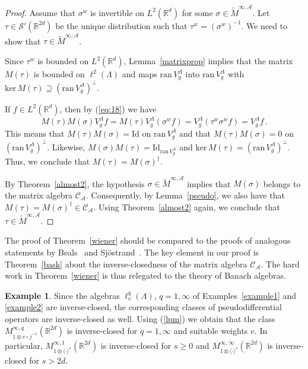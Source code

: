 \documentclass[12pt]{amsart}
\theoremstyle{definition}
\newtheorem{example}{Example}[section]
\theoremstyle{remark}
\numberwithin{equation}{section}
\def\cS{\mathcal{S}}
\def\cA{\mathcal{A}}
\def\cC{\mathcal{C}}
\def\bR{{\mathbb{R}}}
\def\cca{\Cal C_\ac}
\def\weyl{\sigma^w}
\def\rd{\bR^d}
\def\rdd{{\bR^{2d}}}
\def\lrd{L^2(\rd)}
\def\inv{^{-1}}
\def\cS{\mathcal{S}}
\def\cA{\mathcal{A}}
\def\cC{\mathcal{C}}
\newcommand{\Cal}{\mathcal}
\newcommand{\La}{\Lambda}
\newcommand{\lan}{\langle}
\newcommand{\ran}{\rangle}
\newcommand{\ac}{\Cal A}
\newcommand{\moda}{\widetilde M^{\infty,\ac}}
\begin{document}
\begin{proof}
Assume that $\weyl$ is invertible on $\lrd$ for some
$\sigma\in\moda$. Let $\tau \in \cS ' (\rdd )$ be the unique
distribution such that $\tau ^w = (\weyl )\inv $. We need to show
that $\tau\in\moda$.

Since $\tau^w$ is bounded on $\lrd$,  Lemma~\ref{matrixprop}
implies  that the matrix $M(\tau ) $ is
 bounded on $\ell ^2(\La) $ and  maps
$\mathrm{ran} \, V_g^\La $ into $\mathrm{ran} \, V_g^\La $ with
$\mathrm{ker} \, M(\tau ) \supseteq (\mathrm{ran}\, V_g^\La )
^{\perp }$.

If $f\in\lrd$, then by (\ref{eq:18})  we have 
$$
  M(\tau ) M(\sigma ) V_g^\La f = M(\tau ) V_g^\La (\weyl f) =   V_g^\La (\tau
  ^w \weyl f) = V_g^\La f \, .
$$
This means that $  M(\tau ) M(\sigma ) = \mathrm{Id}$ on
$\mathrm{ran}\, V_g^\Lambda $ and that $M(\tau ) M(\sigma ) = 0$
on
$(\mathrm{ran}\, V_g^\Lambda )^\perp $.
Likewise, $M(\sigma ) M(\tau ) = \mathrm{Id}_{\mathrm{ran}\,
  V_g^\La}$ and $\mathrm{ker}\, M(\tau )=(\mathrm{ran} \, V_g^\La )^{\perp} $.
Thus, we  conclude that $M(\tau ) = M(\sigma ) ^\dagger $.

By Theorem~\ref{almost2}, the hypothesis  $\sigma \in \moda $
implies that $M(\sigma )$ belongs to the matrix algebra $\cca$.
Consequently, by Lemma~\ref{pseudo}, we also have that $M(\tau ) =
M(\sigma )^\dagger \in \cca$. Using Theorem~\ref{almost2} again,
we conclude that $\tau \in \moda$.
\end{proof}


The proof of Theorem~\ref{wiener} should be compared to the proofs of
analogous statements by Beals~\cite{beals77} and
Sj\"ostrand~\cite{Sjo95}. The key element in our proof is Theorem~\ref{bask}
about the inverse-closedness of the matrix algebra $\cC _{\cA}$. The
hard work in Theorem~\ref{wiener} is thus relegated to the theory of Banach
algebras. 

\begin{example}\label{example3} Since the algebras $\ell^q_{v}(\Lambda )$,
$q=1,\infty$ of Examples~\ref{example1} and
\ref{example2} are inverse-closed, the corresponding classes of
pseudodifferential operators are inverse-closed as well. Using
(\ref{lpm}) we obtain that the class $M^{\infty,q}_{1\otimes
v\circ j^{-1}}(\rdd)$ is inverse-closed for $q=1,\infty$ and
suitable weights $v$. In particular,
$M^{\infty,1}_{1\otimes\lan\cdot\ran^s}(\rdd)$ is inverse-closed
for $s\ge 0$ and
$M^{\infty,\infty}_{1\otimes\lan\cdot\ran^s}(\rdd)$ is
inverse-closed for $s>2d$.
\end{example}
\end{document}
